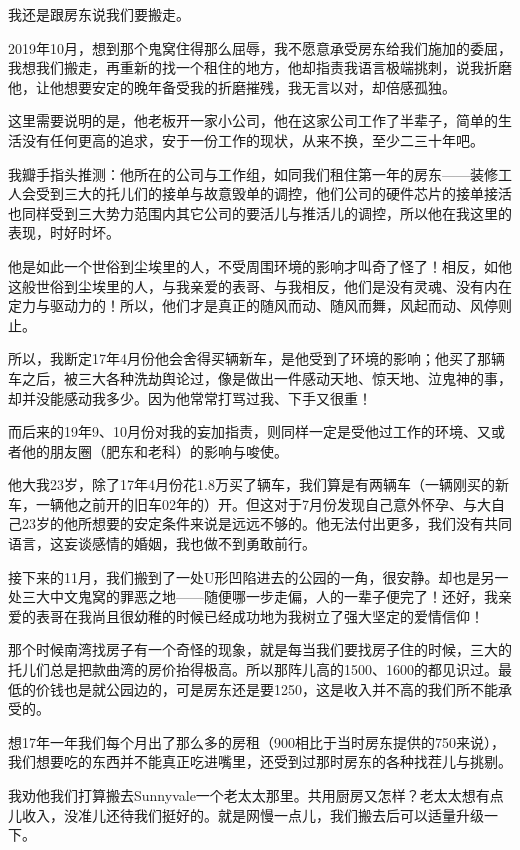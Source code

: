 \documentclass[9pt, b5paper]{article}
\begin{document}
我还是跟房东说我们要搬走。 

2019年10月，想到那个鬼窝住得那么屈辱，我不愿意承受房东给我们施加的委屈，我想我们搬走，再重新的找一个租住的地方，他却指责我语言极端挑刺，说我折磨他，让他想要安定的晚年备受我的折磨摧残，我无言以对，却倍感孤独。

这里需要说明的是，他老板开一家小公司，他在这家公司工作了半辈子，简单的生活没有任何更高的追求，安于一份工作的现状，从来不换，至少二三十年吧。

我瓣手指头推测：他所在的公司与工作组，如同我们租住第一年的房东——装修工人会受到三大的托儿们的接单与故意毁单的调控，他们公司的硬件芯片的接单接活也同样受到三大势力范围内其它公司的要活儿与推活儿的调控，所以他在我这里的表现，时好时坏。

他是如此一个世俗到尘埃里的人，不受周围环境的影响才叫奇了怪了！相反，如他这般世俗到尘埃里的人，与我亲爱的表哥、与我相反，他们是没有灵魂、没有内在定力与驱动力的！所以，他们才是真正的随风而动、随风而舞，风起而动、风停则止。

所以，我断定17年4月份他会舍得买辆新车，是他受到了环境的影响；他买了那辆车之后，被三大各种洗劫舆论过，像是做出一件感动天地、惊天地、泣鬼神的事，却并没能感动我多少。因为他常常打骂过我、下手又很重！

而后来的19年9、10月份对我的妄加指责，则同样一定是受他过工作的环境、又或者他的朋友圈（肥东和老科）的影响与唆使。

他大我23岁，除了17年4月份花1.8万买了辆车，我们算是有两辆车（一辆刚买的新车，一辆他之前开的旧车02年的）开。但这对于7月份发现自己意外怀孕、与大自己23岁的他所想要的安定条件来说是远远不够的。他无法付出更多，我们没有共同语言，这妄谈感情的婚姻，我也做不到勇敢前行。

接下来的11月，我们搬到了一处U形凹陷进去的公园的一角，很安静。却也是另一处三大中文鬼窝的罪恶之地——随便哪一步走偏，人的一辈子便完了！还好，我亲爱的表哥在我尚且很幼稚的时候已经成功地为我树立了强大坚定的爱情信仰！

那个时候南湾找房子有一个奇怪的现象，就是每当我们要找房子住的时候，三大的托儿们总是把款曲湾的房价抬得极高。所以那阵儿高的1500、1600的都见识过。最低的价钱也是就公园边的，可是房东还是要1250，这是收入并不高的我们所不能承受的。

想17年一年我们每个月出了那么多的房租（900相比于当时房东提供的750来说），我们想要吃的东西并不能真正吃进嘴里，还受到过那时房东的各种找茬儿与挑剔。

我劝他我们打算搬去Sunnyvale一个老太太那里。共用厨房又怎样？老太太想有点儿收入，没准儿还待我们挺好的。就是网慢一点儿，我们搬去后可以适量升级一下。
\end{document}
